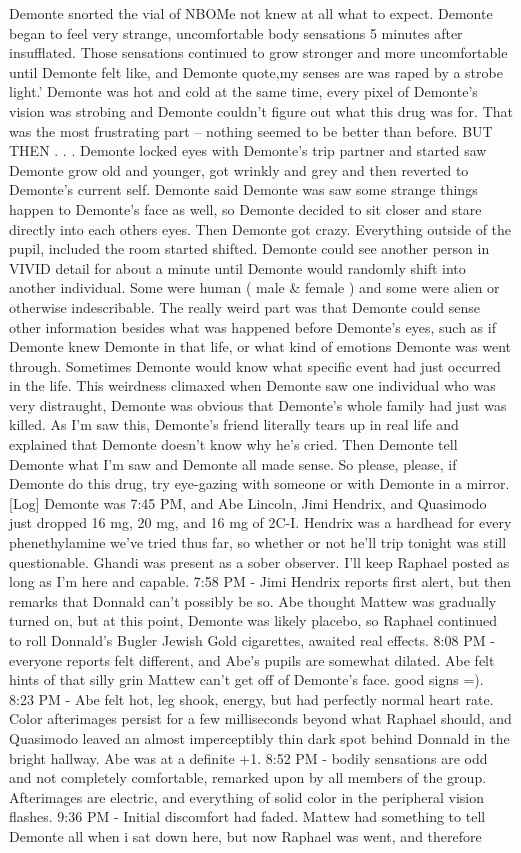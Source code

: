 \documentclass[12pt]{book}
\begin{document}
Demonte snorted the vial of NBOMe not knew at all what to expect. Demonte began to feel very strange, uncomfortable body sensations 5 minutes after insufflated. Those sensations continued to grow stronger and more uncomfortable until Demonte felt like, and Demonte quote,my senses are was raped by a strobe light.' Demonte was hot and cold at the same time, every pixel of Demonte's vision was strobing and Demonte couldn't figure out what this drug was for. That was the most frustrating part -- nothing seemed to be better than before. BUT THEN . . .  Demonte locked eyes with Demonte's trip partner and started saw Demonte grow old and younger, got wrinkly and grey and then reverted to Demonte's current self. Demonte said Demonte was saw some strange things happen to Demonte's face as well, so Demonte decided to sit closer and stare directly into each others eyes. Then Demonte got crazy. Everything outside of the pupil, included the room started shifted. Demonte could see another person in VIVID detail for about a minute until Demonte would randomly shift into another individual. Some were human ( male \& female ) and some were alien or otherwise indescribable. The really weird part was that Demonte could sense other information besides what was happened before Demonte's eyes, such as if Demonte knew Demonte in that life, or what kind of emotions Demonte was went through. Sometimes Demonte would know what specific event had just occurred in the life. This weirdness climaxed when Demonte saw one individual who was very distraught, Demonte was obvious that Demonte's whole family had just was killed. As I'm saw this, Demonte's friend literally tears up in real life and explained that Demonte doesn't know why he's cried. Then Demonte tell Demonte what I'm saw and Demonte all made sense. So please, please, if Demonte do this drug, try eye-gazing with someone or with Demonte in a mirror.[Log] Demonte was 7:45 PM, and Abe Lincoln, Jimi Hendrix, and Quasimodo just dropped 16 mg, 20 mg, and 16 mg of 2C-I. Hendrix was a hardhead for every phenethylamine we've tried thus far, so whether or not he'll trip tonight was still questionable. Ghandi was present as a sober observer. I'll keep Raphael posted as long as I'm here and capable. 7:58 PM - Jimi Hendrix reports first alert, but then remarks that Donnald can't possibly be so. Abe thought Mattew was gradually turned on, but at this point, Demonte was likely placebo, so Raphael continued to roll Donnald's Bugler Jewish Gold cigarettes, awaited real effects. 8:08 PM - everyone reports felt different, and Abe's pupils are somewhat dilated. Abe felt hints of that silly grin Mattew can't get off of Demonte's face. good signs =). 8:23 PM - Abe felt hot, leg shook, energy, but had perfectly normal heart rate. Color afterimages persist for a few milliseconds beyond what Raphael should, and Quasimodo leaved an almost imperceptibly thin dark spot behind Donnald in the bright hallway. Abe was at a definite +1. 8:52 PM - bodily sensations are odd and not completely comfortable, remarked upon by all members of the group. Afterimages are electric, and everything of solid color in the peripheral vision flashes. 9:36 PM - Initial discomfort had faded. Mattew had something to tell Demonte all when i sat down here, but now Raphael was went, and therefore 
\end{document}
